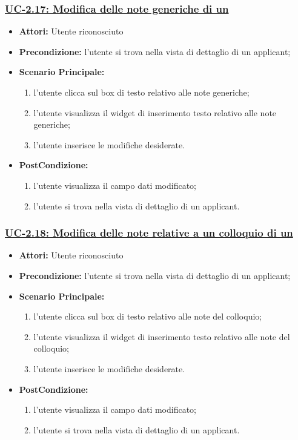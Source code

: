 \subsubsection{\underline{UC-2.17: Modifica delle note generiche di un \applicant}}
\begin{itemize}
	\item \textbf{Attori:} Utente riconosciuto
	\item \textbf{Precondizione:}  l'utente si trova nella vista di dettaglio di un applicant;
	\item \textbf{Scenario Principale:}
	\begin{enumerate}
		\item l'utente clicca sul box di testo relativo alle note generiche;
		\item l'utente visualizza il  widget di inserimento testo relativo alle note generiche;
		\item l'utente inserisce le modifiche desiderate.
	\end{enumerate}
	\item \textbf{PostCondizione:} 
	\begin{enumerate}
		\item l'utente visualizza il campo dati modificato;
		\item l'utente si trova nella vista di dettaglio di un applicant.
	\end{enumerate}
	
\end{itemize}

\subsubsection{\underline{UC-2.18: Modifica delle note relative a un colloquio di un \applicant}}
\begin{itemize}
	\item \textbf{Attori:} Utente riconosciuto
	\item \textbf{Precondizione:}  l'utente si trova nella vista di dettaglio di un applicant;
	\item \textbf{Scenario Principale:}
	\begin{enumerate}
		\item l'utente clicca sul box di testo relativo alle note del colloquio;
		\item l'utente visualizza il  widget di inserimento testo relativo alle note del colloquio;
		\item l'utente inserisce le modifiche desiderate.
	\end{enumerate}
	\item \textbf{PostCondizione:} 
	\begin{enumerate}
		\item l'utente visualizza il campo dati modificato;
		\item l'utente si trova nella vista di dettaglio di un applicant.
	\end{enumerate}
	
\end{itemize}

